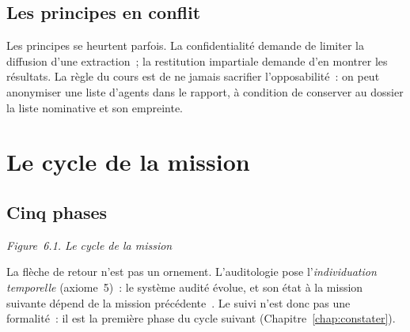 \subsection{Les principes en conflit}

Les principes se heurtent parfois. La confidentialité demande de limiter la
diffusion d'une extraction~; la restitution impartiale demande d'en
montrer les résultats. La règle du cours est de ne jamais sacrifier
l'opposabilité~: on peut anonymiser une liste d'agents dans le rapport, à
condition de conserver au dossier la liste nominative et son empreinte.

\separateur

\section{Le cycle de la mission}
\label{sec:c06-cycle}

\subsection{Cinq phases}

\begin{center}
\end{center}
\vspace{-0.2em}
\begin{center}{\small\itshape Figure~6.1. Le cycle de la mission}\end{center}

La flèche de retour n'est pas un ornement. L'auditologie pose
l'\emph{individuation temporelle} (axiome~5)~: le système audité évolue,
et son état à la mission suivante dépend de la mission
précédente~\cite{minka2026auditologie}. Le suivi n'est donc pas une
formalité~: il est la première phase du cycle suivant
(Chapitre~\ref{chap:constater}).

